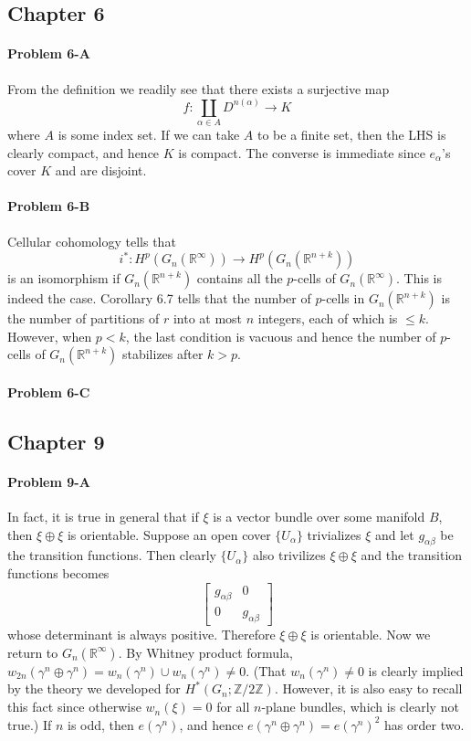 \documentclass[12pt]{article}
\theoremstyle{plain}
\theoremstyle{definition}
\newcommand{\IR}{\mathbb{R}}
\newcommand{\IZ}{\mathbb{Z}}
\newcommand{\<}{\langle}
\renewcommand{\>}{\rangle}
\begin{document}
\subsection*{Chapter 6}
\paragraph{Problem 6-A}
From the definition we readily see that there exists a surjective map 
$$ f : \coprod_{\alpha \in A} D^{n(\alpha)} \to K $$ where $A$ is some index set. If we can take $A$ to be a finite set, then the LHS is clearly compact, and hence $K$ is compact. The converse is immediate since $e_\alpha$'s cover $K$ and are disjoint. 

\paragraph{Problem 6-B}
Cellular cohomology tells that $$ i^* : H^p(G_n(\IR^\infty)) \to H^p(G_n(\IR^{n + k})) $$
is an isomorphism if $G_n(\IR^{n + k})$  contains all the $p$-cells of $G_n(\IR^\infty)$. This is indeed the case. Corollary 6.7 tells that the number of $p$-cells in $G_n(\IR^{n + k})$ is the number of partitions of $r$ into at most $n$ integers, each of which is $\le k$. However, when $p < k$, the last condition is vacuous and hence the number of $p$-cells of $G_n(\IR^{n + k})$ stabilizes after $k > p$. 

\paragraph{Problem 6-C}


\subsection*{Chapter 9}
\paragraph{Problem 9-A}
In fact, it is true in general that if $\xi$ is a vector bundle over some manifold $B$, then $\xi \oplus \xi$ is orientable. Suppose an open cover $\{ U_\alpha \}$ trivializes $\xi$ and let $g_{\alpha \beta}$ be the transition functions. Then clearly $\{U_\alpha\}$ also trivilizes $\xi \oplus \xi$ and the transition functions becomes 
$$ \begin{bmatrix}
g_{\alpha \beta } & 0 \\ 0 & g_{\alpha \beta} 
\end{bmatrix}$$ whose determinant is always positive. Therefore $\xi \oplus \xi$ is orientable. Now we return to $G_n(\IR^\infty)$. By Whitney product formula, $w_{2n}(\gamma^n \oplus \gamma^n) = w_n (\gamma^n) \cup w_n(\gamma^n) \neq 0$. (That $w_n(\gamma^n) \neq 0$ is clearly implied by the theory we developed for $H^*(G_n; \IZ/2\IZ)$. However, it is also easy to recall this fact since otherwise $w_n(\xi) = 0$ for all $n$-plane bundles, which is clearly not true.) If $n$ is odd, then $e(\gamma^n)$, and hence $e(\gamma^n \oplus \gamma^n) = e(\gamma^n)^2$ has order two. 
\end{document}
